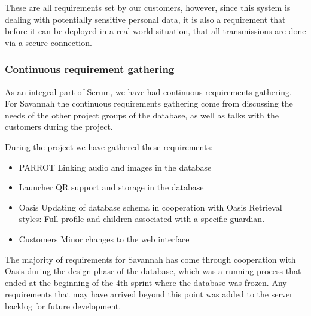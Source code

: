 These are all requirements set by our customers, however, since this system is dealing with potentially sensitive personal data, it is 
also a requirement that before it can be deployed in a real world situation, that all transmissions are done via a secure connection.

\subsubsection*{Continuous requirement gathering}
As an integral part of Scrum, we have had continuous requirements gathering.
For Savannah the continuous requirements gathering come from discussing the needs of the other project groups of the database, as well as talks with the customers
during the project.

During the project we have gathered these requirements:
\begin{itemize}
 \item PARROT
  \subitem Linking audio and images in the database
 \item Launcher
  \subitem QR support and storage in the database
 \item Oasis
  \subitem Updating of database schema in cooperation with Oasis
  \subitem Retrieval styles: Full profile and children associated with a specific guardian.
 \item Customers
  \subitem Minor changes to the web interface
\end{itemize}

The majority of requirements for Savannah has come through cooperation with Oasis during the design phase of the database, which was a running process that ended
at the beginning of the 4th sprint where the database was frozen. Any requirements that may have arrived beyond this point was added to the server backlog for future development.